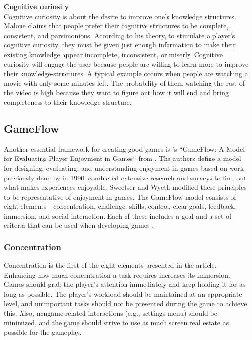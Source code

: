 \textbf{Cognitive curiosity} \\
Cognitive curiosity is about the desire to improve one’s knowledge structures. Malone claims that people prefer their cognitive structures to be complete, consistent, and parsimonious. According to his theory, to stimulate a player’s cognitive curiosity, they must be given just enough information to make their existing knowledge appear incomplete, inconsistent, or miserly. Cognitive curiosity will engage the user because people are willing to learn more to improve their knowledge-structures. A typical example occurs when people are watching a movie with only some minutes left. The probability of them watching the rest of the video is high because they want to figure out how it will end and bring completeness to their knowledge structure.

\subsection{GameFlow}
Another essential framework for creating good games is \citeauthor{sweetser_gameflow_2005}’s “GameFlow: A Model for Evaluating Player Enjoyment in Games“ from \citeyear{sweetser_gameflow_2005}. The authors define a model for designing, evaluating, and understanding enjoyment in games based on work previously done by \citeauthor{csikszentmihalyi_flow_1990} in 1990. \citeauthor{csikszentmihalyi_flow_1990} conducted extensive research and surveys to find out what makes experiences enjoyable. Sweetser and Wyeth modified these principles to be representative of enjoyment in games. The GameFlow model consists of eight elements—concentration, challenge, skills, control, clear goals, feedback, immersion, and social interaction. Each of these includes a goal and a set of criteria that can be used when developing games \citep{sweetser_gameflow_2005}.

\subsubsection{Concentration}
Concentration is the first of the eight elements presented in the article. Enhancing how much concentration a task requires increases its immersion. Games should grab the player’s attention immediately and keep holding it for as long as possible. The player’s workload should be maintained at an appropriate level, and unimportant tasks should not be presented during the game to achieve this. Also, nongame-related interactions (e.g., settings menu) should be minimized, and the game should strive to use as much screen real estate  as possible for the gameplay. 

